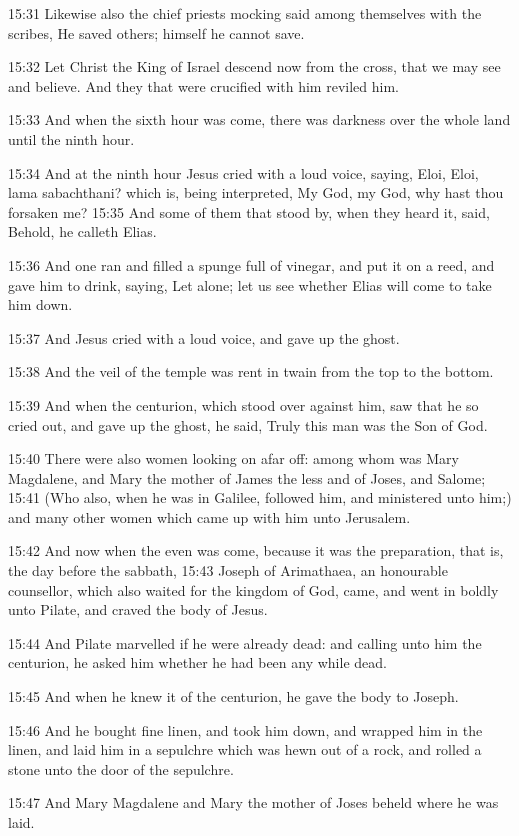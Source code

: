 15:31 Likewise also the chief priests mocking said among themselves with the scribes, He saved others; himself he cannot save.

15:32 Let Christ the King of Israel descend now from the cross, that we may see and believe. And they that were crucified with him reviled him.

15:33 And when the sixth hour was come, there was darkness over the whole land until the ninth hour.

15:34 And at the ninth hour Jesus cried with a loud voice, saying, Eloi, Eloi, lama sabachthani? which is, being interpreted, My God, my God, why hast thou forsaken me?  15:35 And some of them that stood by, when they heard it, said, Behold, he calleth Elias.

15:36 And one ran and filled a spunge full of vinegar, and put it on a reed, and gave him to drink, saying, Let alone; let us see whether Elias will come to take him down.

15:37 And Jesus cried with a loud voice, and gave up the ghost.

15:38 And the veil of the temple was rent in twain from the top to the bottom.

15:39 And when the centurion, which stood over against him, saw that he so cried out, and gave up the ghost, he said, Truly this man was the Son of God.

15:40 There were also women looking on afar off: among whom was Mary Magdalene, and Mary the mother of James the less and of Joses, and Salome; 15:41 (Who also, when he was in Galilee, followed him, and ministered unto him;) and many other women which came up with him unto Jerusalem.

15:42 And now when the even was come, because it was the preparation, that is, the day before the sabbath, 15:43 Joseph of Arimathaea, an honourable counsellor, which also waited for the kingdom of God, came, and went in boldly unto Pilate, and craved the body of Jesus.

15:44 And Pilate marvelled if he were already dead: and calling unto him the centurion, he asked him whether he had been any while dead.

15:45 And when he knew it of the centurion, he gave the body to Joseph.

15:46 And he bought fine linen, and took him down, and wrapped him in the linen, and laid him in a sepulchre which was hewn out of a rock, and rolled a stone unto the door of the sepulchre.

15:47 And Mary Magdalene and Mary the mother of Joses beheld where he was laid.

